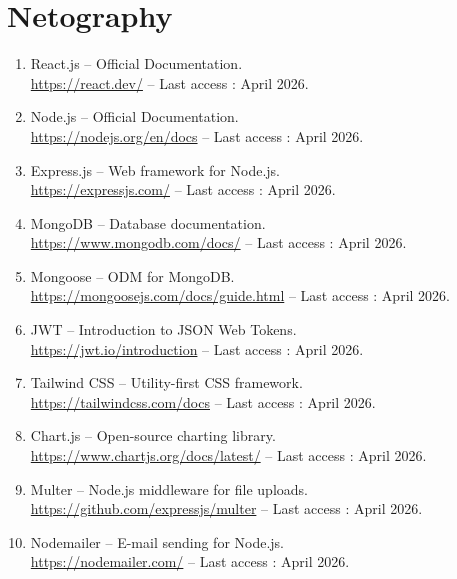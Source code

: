 
\chapter*{Netography}


\begin{enumerate}[leftmargin=2em,itemsep=0.4em]
  \item React.js -- Official Documentation. \\
        \url{https://react.dev/} -- Last access : April 2026.
  \item Node.js -- Official Documentation. \\
        \url{https://nodejs.org/en/docs} -- Last access : April 2026.
  \item Express.js -- Web framework for Node.js. \\
        \url{https://expressjs.com/} -- Last access : April 2026.
  \item MongoDB -- Database documentation. \\
        \url{https://www.mongodb.com/docs/} -- Last access : April 2026.
  \item Mongoose -- ODM for MongoDB. \\
        \url{https://mongoosejs.com/docs/guide.html} -- Last access : April 2026.
  \item JWT -- Introduction to JSON Web Tokens. \\
        \url{https://jwt.io/introduction} -- Last access : April 2026.
  \item Tailwind CSS -- Utility-first CSS framework. \\
        \url{https://tailwindcss.com/docs} -- Last access : April 2026.
  \item Chart.js -- Open-source charting library. \\
        \url{https://www.chartjs.org/docs/latest/} -- Last access : April 2026.
  \item Multer -- Node.js middleware for file uploads. \\
        \url{https://github.com/expressjs/multer} -- Last access : April 2026.
  \item Nodemailer -- E-mail sending for Node.js. \\
        \url{https://nodemailer.com/} -- Last access : April 2026.

\end{enumerate}
